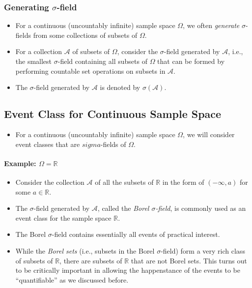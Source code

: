 \subsubsection{Generating \(\sigma\)-field}
\begin{itemize}
\item For a continuous (uncountably infinite) sample space \(\Omega\),
  we often \emph{generate} \(\sigma\)-fields from some collections of
  subsets of \(\Omega\).
\item For a collection \(\mathcal{A}\) of subsets of \(\Omega\),
  consider the \(\sigma\)-field generated by \(\mathcal{A}\), i.e.,
  the smallest \(\sigma\)-field containing all subsets of \(\Omega\)
  that can be formed by performing countable set operations on subsets
  in \(\mathcal{A}\).
\item The \(\sigma\)-field generated by \(\mathcal{A}\) is denoted by
  \(\sigma(\mathcal{A})\).
\end{itemize}

\subsection{Event Class for Continuous Sample Space}
\begin{itemize}
\item For a continuous (uncountably infinite) sample space \(\Omega\),
  we will consider event classes that are \(sigma\)-fields of
  \(\Omega\).
\end{itemize}

\paragraph{Example: \(\Omega=\mathbb{R}\)}
\begin{itemize}
\item Consider the collection \(\mathcal{A}\) of all the subsets of
  \(\mathbb{R}\) in the form of \((-\infty, a)\) for some
  \(a \in \mathbb{R}\).
\item The \(\sigma\)-field generated by \(\mathcal{A}\), called the
  \emph{Borel \(\sigma\)-field}, is commonly used as an event class for
  the sample space \(\mathbb{R}\).
\item The Borel \(\sigma\)-field contains essentially all events of
  practical interest.
\item While the \emph{Borel sets} (i.e., subsets in
  the Borel \(\sigma\)-field) form a very rich class of subsets  of
  \(\mathbb{R}\), there are subsets of \(\mathbb{R}\) that are not
  Borel sets. This turns out to be critically important in allowing the
  happenstance of the events to be ``quantifiable'' as we discussed
  before.
\end{itemize}


